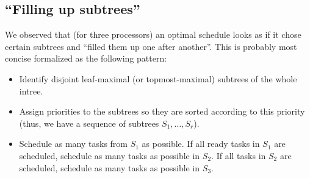 \begin{center}
\end{center}

\subsection{``Filling up subtrees''}
\label{sec:suboptimal-filling-subtrees}

We observed that (for three processors) an optimal schedule looks as if it chose certain subtrees and ``filled them up one after another''. This is probably most concise formalized as the following pattern:

\begin{itemize}
\item Identify disjoint leaf-maximal (or topmost-maximal) subtrees of the whole intree.
\item Assign priorities to the subtrees so they are sorted according to this priority (thus, we have a sequence of subtrees $S_1,\dots,S_r$).
\item Schedule as many tasks from $S_1$ as possible. If all ready tasks in $S_1$ are scheduled, schedule as many tasks as possible in $S_2$. If all tasks in $S_2$ are scheduled, schedule as many tasks as possible in $S_3$.
\end{itemize}

